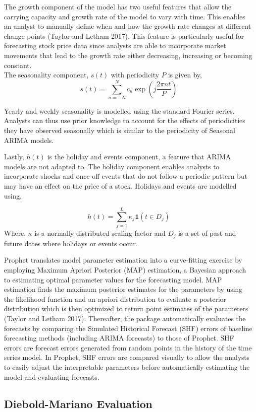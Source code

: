 \documentclass[12pt,a4paper]{article}
\numberwithin{equation}{section}
\numberwithin{figure}{section}
\numberwithin{table}{section}
\begin{document}
The growth component of the model has two useful features that allow the
carrying capacity and growth rate of the model to vary with time. This
enables an analyst to manually define when and how the growth rate
changes at different change points (Taylor and Letham 2017). This
feature is particularly useful for forecasting stock price data since
analysts are able to incorporate market movements that lead to the
growth rate either decreasing, increasing or becoming constant.\\
The seasonality component, \(s(t)\) with periodicity \(P\) is given by,
\[s(t) = \sum_{n = -N}^{N}c_n \exp(j\frac{2\pi nt}{P})\]

Yearly and weekly seasonality is modelled using the standard Fourier
series. Analysts can thus use prior knowledge to account for the effects
of periodicities they have observed seasonally which is similar to the
periodicity of Seasonal ARIMA models.

Lastly, \(h(t)\) is the holiday and events component, a feature that
ARIMA models are not adapted to. The holiday component enables analysts
to incorporate shocks and once-off events that do not follow a periodic
pattern but may have an effect on the price of a stock. Holidays and
events are modelled using,

\[ h(t) = \sum_{j = 1}^{L}\kappa_j \boldsymbol{1}(t \in D_j) \label{eqn5}
\] Where, \(\kappa\) is a normally distributed scaling factor and
\(D_j\) is a set of past and future dates where holidays or events
occur.

Prophet translates model parameter estimation into a curve-fitting
exercise by employing Maximum Apriori Posterior (MAP) estimation, a
Bayesian approach to estimating optimal parameter values for the
forecasting model. MAP estimation finds the maximum posterior estimates
for the parameters by using the likelihood function and an apriori
distribution to evaluate a posterior distribution which is then
optimized to return point estimates of the parameters (Taylor and Letham
2017). Thereafter, the package automatically evaluates the forecasts by
comparing the Simulated Historical Forecast (SHF) errors of baseline
forecasting methods (including ARIMA forecasts) to those of Prophet. SHF
errors are forecast errors generated from random points in the history
of the time series model. In Prophet, SHF errors are compared visually
to allow the analysts to easily adjust the interpretable parameters
before automatically estimating the model and evaluating forecasts.

\subsection{Diebold-Mariano
Evaluation}\label{diebold-mariano-evaluation}
\end{document}
